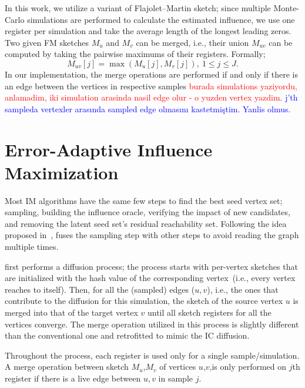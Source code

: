 \documentclass[10pt,journal,compsoc]{IEEEtran}
\newcommand\ggx[1]{\textcolor{blue}{#1}}
\newcommand\acro{{\sc{HyperFuseR\xspace}\xspace}\xspace}
\newcommand\kktodo[1]{\textcolor{red}{#1}}
\begin{document}
In this work, we utilize a variant of Flajolet–Martin sketch; since multiple Monte-Carlo simulations are performed to calculate the estimated influence, we use one register per simulation and take the average length of the longest leading zeros. Two given FM sketches $M_u$ and $M_v$ can be merged, i.e., their union $M_{uv}$ can be computed by taking the pairwise maximums of their registers. Formally; 
\begin{equation}
\label{eq:sketch-merge}
    M_{uv}[j] = \max(M_u[j], M_v[j]),~1 \leq j \leq J.
\end{equation} 
In our implementation, the merge operations are performed if and only if there is an edge between the vertices in respective samples \kktodo{burada simulations yaziyordu, anlamadim, iki simulation arasinda nasil edge olur - o yuzden vertex yazdim}. \ggx{ j'th sampleda vertexler arasında sampled edge olmasını kastetmiştim. Yanlis olmus.}  

\section{Error-Adaptive Influence Maximization}\label{sec:method}

Most IM algorithms have the same few steps to find the best seed vertex set; sampling, building the influence oracle, verifying the impact of new candidates, and removing the latent seed set's residual reachability set. Following the idea proposed in~\cite{infuser}, \acro fuses the sampling step with other steps to avoid reading the graph multiple times. 

\acro first performs a diffusion process; the process starts with per-vertex sketches that are initialized with the hash value of the corresponding vertex~(i.e., every vertex reaches to itself). Then, for all the (sampled) edges ($u, v$), i.e., the ones that contribute to the diffusion for this simulation, the sketch of the source vertex $u$ is merged into that of the target vertex $v$ until all sketch registers for all the vertices converge. The merge operation utilized in this process is slightly different than the conventional one and retrofitted to mimic the IC diffusion. 

Throughout the process, each register is used only for a single sample/simulation. 
A merge operation between sketch $M_u$,$M_v$ of vertices $u$,$v$,is only performed on $j$th register if there is a live edge between $u,v$ in sample $j$.
\end{document}
